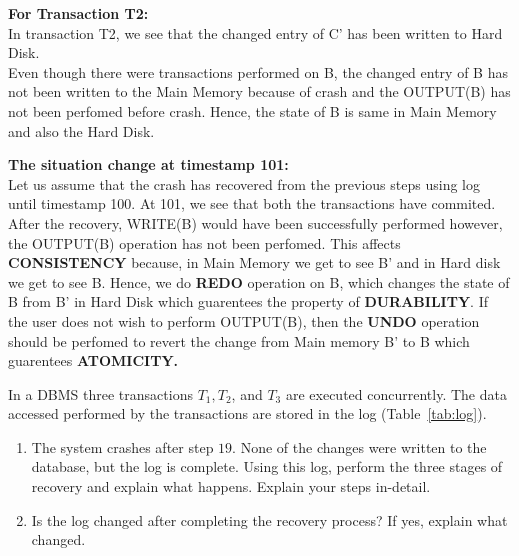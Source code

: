 \begin{enumerate}
\textbf{For Transaction T2:}\\
In transaction T2, we see that the changed entry of C' has been written to Hard Disk. \\
Even though there were transactions performed on B, the changed entry of B has not been written to the Main Memory because of crash and the OUTPUT(B) has not been perfomed before crash.
Hence, the state of B is same in Main Memory and also the Hard Disk.

\textbf{The situation change at timestamp 101:}\\
Let us assume that the crash has recovered from the previous steps using log until timestamp 100. 
At 101, we see that both the transactions have commited. After the recovery, WRITE(B) would have been successfully performed however, the OUTPUT(B) operation has not been perfomed.
This affects \textbf{CONSISTENCY} because, in Main Memory we get to see B' and in Hard disk we get to see B.
Hence, we do \textbf{REDO} operation on B, which changes the state of B from B' in Hard Disk which guarentees the property of \textbf{DURABILITY}.
If the user does not wish to perform OUTPUT(B), then the \textbf{UNDO} operation should be perfomed to revert the change from Main memory B' to B which guarentees \textbf{ATOMICITY.}




\end{enumerate}

\newpage
{}

In a DBMS three transactions $T_1,T_2$, and $T_3$ are executed concurrently. The data accessed performed by the transactions are stored in the log (Table~\ref{tab:log}).

\begin{enumerate}
  \item The system crashes after step $19$. None of the changes were written to the database, but the log is complete. Using this log, perform the three stages of recovery and explain what happens. 
  Explain your steps in-detail.
  \item Is the log changed after completing the recovery process? If yes, explain what changed.

\end{enumerate}

